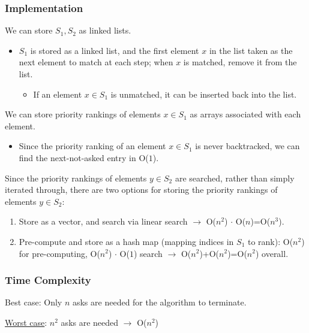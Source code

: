 \documentclass[12pt]{extarticle}
\theoremstyle{definition}
\theoremstyle{remark}
\begin{document}
\subsubsection*{Implementation}
We can store $S_1,S_2$ as linked lists.
\begin{itemize}
    \item $S_1$ is stored as a linked list, and the first element $x$ in the list taken as the next element to match at each step; when $x$ is matched, remove it from the list. \begin{itemize}
        \item If an element $x\in S_1$ is unmatched, it can be inserted back into the list.
    \end{itemize}
\end{itemize}

\noindent We can store priority rankings of elements $x\in S_1$ as arrays associated with each element.
\begin{itemize}
    \item Since the priority ranking of an element $x\in S_1$ is never backtracked, we can find the next-not-asked entry in O($1$).
\end{itemize}

\noindent Since the priority rankings of elements $y\in S_2$ are searched, rather than simply iterated through, there are two options for storing the priority rankings of elements $y\in S_2$: \begin{enumerate}
    \item Store as a vector, and search via linear search $\rightarrow$ O($n^2$) $\cdot$ O($n$)=O($n^3$).
    \item Pre-compute and store as a hash map (mapping indices in $S_1$ to rank): O($n^2$) for pre-computing, O($n^2$) $\cdot$ O($1$) search $\rightarrow$ O($n^2$)+O($n^2$)=O($n^2$) overall.
\end{enumerate}

\subsubsection*{Time Complexity}
Best case: Only $n$ asks are needed for the algorithm to terminate.

\noindent \ul{Worst case}: $n^2$ asks are needed $\rightarrow$ O($n^2$)
\end{document}
